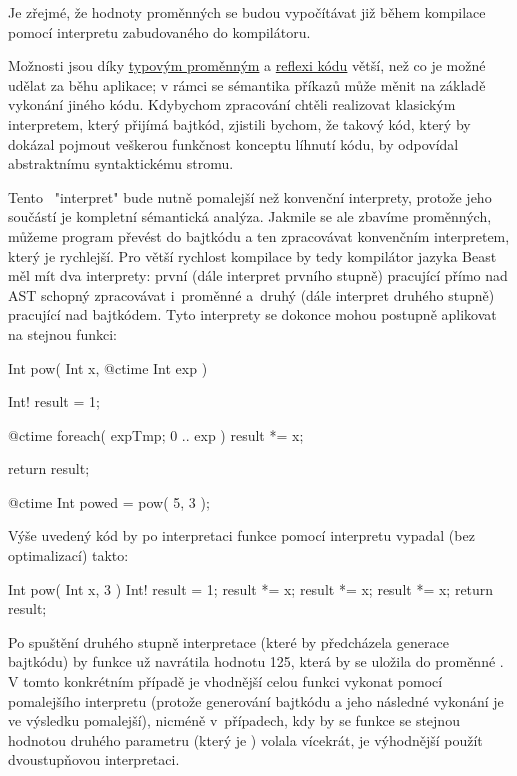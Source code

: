 Je zřejmé, že hodnoty \ctime proměnných se budou vypočítávat již během kompilace pomocí interpretu zabudovaného do kompilátoru.

Možnosti \ctime jsou díky \hyperref[ctime:typeVars]{typovým proměnným} a \hyperref[ctime:reflection]{reflexi kódu} větší, než co je možné udělat za běhu aplikace; v rámci \ctime se sémantika příkazů může měnit na základě vykonání jiného \ctime kódu. Kdybychom zpracování \ctime chtěli realizovat klasickým interpretem, který přijímá bajtkód, zjistili bychom, že takový kód, který by dokázal pojmout veškerou funkčnost konceptu líhnutí kódu, by odpovídal abstraktnímu syntaktickému stromu.

Tento \ctime~"interpret" bude nutně pomalejší než konvenční interprety, protože jeho součástí je kompletní sémantická analýza. Jakmile se ale zbavíme \ctime proměnných, můžeme program převést do bajtkódu a ten zpracovávat konvenčním interpretem, který je rychlejší. Pro větší rychlost kompilace by tedy kompilátor jazyka Beast měl mít dva interprety: první (dále interpret prvního stupně) pracující přímo nad AST schopný zpracovávat i~\ctime proměnné a~druhý (dále interpret druhého stupně) pracující nad bajtkódem. Tyto interprety se dokonce mohou postupně aplikovat na stejnou funkci:

\begin{code}
Int pow( Int x, @ctime Int exp ) {
	Int! result = 1;
	
	@ctime foreach( expTmp; 0 .. exp )
		result *= x;
		
	return result;
}

@ctime Int powed = pow( 5, 3 );
\end{code}

Výše uvedený kód by po interpretaci funkce  pomocí \ctime interpretu vypadal (bez optimalizací) takto:

\begin{code}
Int pow( Int x, 3 ) {
	Int! result = 1;
	result *= x;
	result *= x;
	result *= x;
	return result;
}
\end{code}

Po spuštění druhého stupně interpretace (které by předcházela generace bajtkódu) by funkce už navrátila hodnotu 125, která by se uložila do proměnné . V tomto konkrétním případě je vhodnější celou funkci vykonat pomocí pomalejšího \ctime interpretu (protože generování bajtkódu a jeho následné vykonání je ve výsledku pomalejší), nicméně v~případech, kdy by se funkce  se stejnou hodnotou druhého parametru (který je \ctime) volala vícekrát, je výhodnější použít dvoustupňovou interpretaci.

